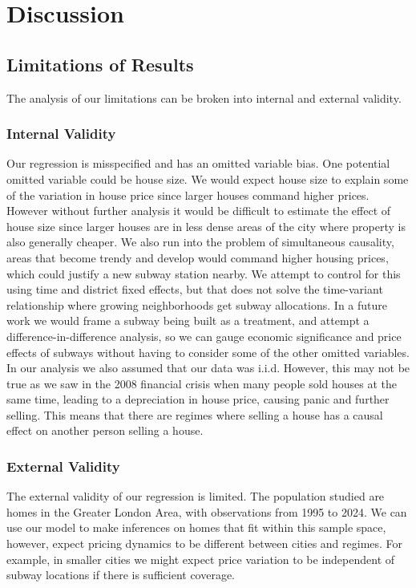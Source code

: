 \section{Discussion}
\label{sec:conclusion}
\subsection{Limitations of Results}
The analysis of our limitations can be broken into internal and external validity.

\subsubsection{Internal Validity}
 Our regression is misspecified and has an omitted variable bias.
  One potential omitted variable could be house size.
   We would expect house size to explain some of the variation in house price since larger houses command higher prices.
    However without further analysis it would be difficult to estimate the effect of house size since larger houses are in less dense areas of the city where property is also generally cheaper.
     We also run into the problem of simultaneous causality, areas that become trendy and develop would command higher housing prices, 
     which could justify a new subway station nearby. We attempt to control for this using time and district fixed effects, 
     but that does not solve the time-variant relationship where growing neighborhoods get subway allocations.
      In a future work we would frame a subway being built as a treatment, and attempt a difference-in-difference analysis, 
      so we can gauge economic significance and price effects of subways without having to consider some of the other omitted variables.
In our analysis we also assumed that our data was i.i.d. However, this may not be true as we 
saw in the 2008 financial crisis when many people sold houses at the same time, leading to a depreciation in 
house price, causing panic and further selling. This means that there are regimes where selling a house has a causal effect on another person selling a house.

\subsubsection{External Validity}
The external validity of our regression is limited. The population studied are homes in the Greater London Area, 
with observations from 1995 to 2024. We can use our model to make inferences on homes that fit within this sample space, 
however, expect pricing dynamics to be different between cities and regimes. For example, in smaller cities we might expect 
price variation to be independent of subway locations if there is sufficient coverage.



